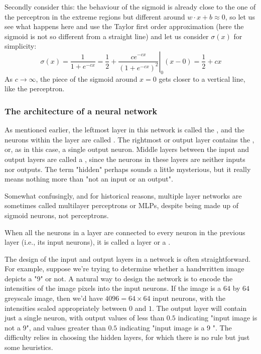 Secondly consider this: the behaviour of the sigmoid is already close to the one of the perceptron in the extreme regions but different around $w\cdot x +b \approx 0$, so let us see what happens here and use the Taylor first order approximation (here the sigmoid is not so different from a straight line) and let us consider $\sigma(x)$ for simplicity:
\begin{equation}
\sigma(x) = \frac{1}{1+e^{-cx}} = \frac{1}{2} +  \left. \frac{ce^{-cx}}{\left(1+e^{-cx}\right)^2}\right|_0 (x-0) = \frac{1}{2}+ cx
\end{equation}
As $c\rightarrow \infty$, the piece of the sigmoid around $x=0$ gets closer to a vertical line, like the perceptron.

\subsubsection{The architecture of a neural network}
As mentioned earlier, the leftmost layer in this network is called the , and the neurons within the layer are called . The rightmost or output layer contains the , or, as in this case, a single output neuron. Middle layers between the input and output layers are called a , since the neurons in these layers are neither inputs nor outputs. The term "hidden" perhaps sounds a little mysterious, but it really means nothing more than "not an input or an output". 

Somewhat confusingly, and for historical reasons, multiple layer networks are sometimes called multilayer perceptrons or MLPs, despite being made up of sigmoid neurons, not perceptrons. 

When all the neurons in a layer are connected to every neuron in the previous layer (i.e., its input neurons), it is called a  layer or a .

The design of the input and output layers in a network is often straightforward. For example, suppose we're trying to determine whether a handwritten image depicts a "9" or not. A natural way to design the network is to encode the intensities of the image pixels into the input neurons. If the image is a $64$ by $64$ greyscale image, then we'd have $4096=64\times64$ input neurons, with the intensities scaled appropriately between $0$ and $1$. The output layer will contain just a single neuron, with output values of less than $0.5$ indicating "input image is not a 9", and values greater than $0.5$ indicating "input image is a 9 ". The difficulty relies in choosing the hidden layers, for which there is no rule but just some heuristics. 

